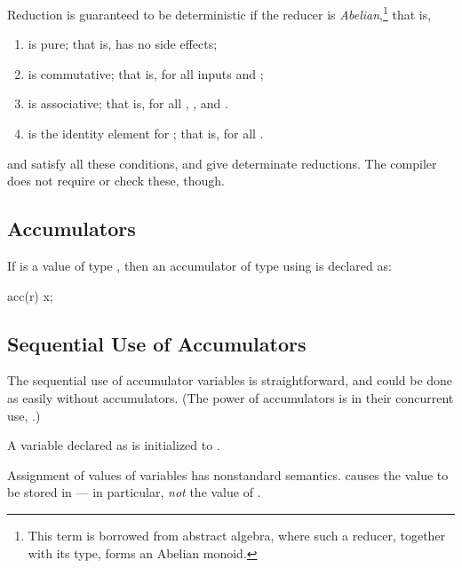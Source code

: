 Reduction is guaranteed to be deterministic if the reducer is {\em
Abelian},\footnote{This term is borrowed from abstract algebra, where such a
reducer, together with its type, forms an Abelian monoid.}
that is, 
\begin{enumerate}
\item {} is pure; that is, has no side effects;
\item {} is commutative; that is,  for all
      inputs  and ;
\item {} is associative; that is, 
       for all , , and .
\item {} is the identity element for ; that is, 
      for all .
\end{enumerate}




 and  satisfy all these conditions, and give
determinate reductions. The compiler does not require or check these, though.


\subsection{Accumulators}

If  is a  value of type , then an accumulator of type
 using  is declared as:
\begin{xten}
acc(r) x;
\end{xten}
%

\subsection{Sequential Use of Accumulators}

The sequential use of accumulator variables is straightforward, and could be
done as easily without accumulators.  (The power of accumulators is in their
concurrent use, .)

A variable declared as  is initialized to .  

Assignment of values of  variables has nonstandard semantics.
 causes the value  to be stored in  --- in
particular, {\em not} the value of .

